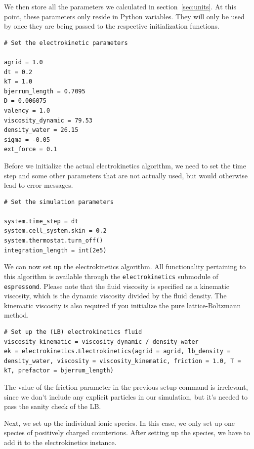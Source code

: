 We then store all the parameters we calculated in section~\ref{sec:units}. At this point, these parameters only reside in Python variables. They will only be used by \ES{} once they are being passed to the respective initialization functions.

\begin{lstlisting}[firstnumber=19]
# Set the electrokinetic parameters

agrid = 1.0
dt = 0.2
kT = 1.0
bjerrum_length = 0.7095
D = 0.006075
valency = 1.0
viscosity_dynamic = 79.53
density_water = 26.15
sigma = -0.05
ext_force = 0.1
\end{lstlisting}

Before we initialize the actual electrokinetics algorithm, we need to set the time step and some other parameters that are not actually used, but would otherwise lead to error messages.

\begin{lstlisting}[firstnumber=32]
# Set the simulation parameters

system.time_step = dt
system.cell_system.skin = 0.2
system.thermostat.turn_off()
integration_length = int(2e5)
\end{lstlisting}

We can now set up the electrokinetics algorithm. All functionality pertaining to this algorithm is available through the \texttt{electrokinetics} submodule of \texttt{espressomd}. Please note that the fluid viscosity is specified as a kinematic viscosity, which is the dynamic viscosity divided by the fluid density. The kinematic viscosity is also required if you initialize the pure lattice-Boltzmann method.

\begin{lstlisting}[firstnumber=39]
# Set up the (LB) electrokinetics fluid
viscosity_kinematic = viscosity_dynamic / density_water
ek = electrokinetics.Electrokinetics(agrid = agrid, lb_density = density_water, viscosity = viscosity_kinematic, friction = 1.0, T = kT, prefactor = bjerrum_length)
\end{lstlisting}

The value of the friction parameter in the previous setup command is irrelevant, since we don't include any explicit particles in our simulation, but it's needed to pass the sanity check of the LB.

Next, we set up the individual ionic species. In this case, we only set up one species of positively charged counterions. After setting up the species, we have to add it to the electrokinetics instance. 

